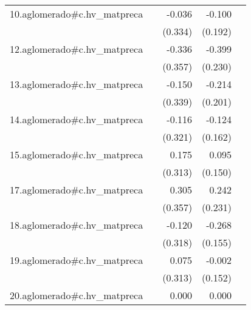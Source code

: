 {\begin{longtable}{l*{4}{D{.}{.}{-1}}}
\addlinespace
10.aglomerado#c.hv\_matpreca&                     &      -0.036         &      -0.100         &                     \\
            &                     &     (0.334)         &     (0.192)         &                     \\
\addlinespace
12.aglomerado#c.hv\_matpreca&                     &      -0.336         &      -0.399         &                     \\
            &                     &     (0.357)         &     (0.230)         &                     \\
\addlinespace
13.aglomerado#c.hv\_matpreca&                     &      -0.150         &      -0.214         &                     \\
            &                     &     (0.339)         &     (0.201)         &                     \\
\addlinespace
14.aglomerado#c.hv\_matpreca&                     &      -0.116         &      -0.124         &                     \\
            &                     &     (0.321)         &     (0.162)         &                     \\
\addlinespace
15.aglomerado#c.hv\_matpreca&                     &       0.175         &       0.095         &                     \\
            &                     &     (0.313)         &     (0.150)         &                     \\
\addlinespace
17.aglomerado#c.hv\_matpreca&                     &       0.305         &       0.242         &                     \\
            &                     &     (0.357)         &     (0.231)         &                     \\
\addlinespace
18.aglomerado#c.hv\_matpreca&                     &      -0.120         &      -0.268         &                     \\
            &                     &     (0.318)         &     (0.155)         &                     \\
\addlinespace
19.aglomerado#c.hv\_matpreca&                     &       0.075         &      -0.002         &                     \\
            &                     &     (0.313)         &     (0.152)         &                     \\
\addlinespace
20.aglomerado#c.hv\_matpreca&                     &       0.000         &       0.000         &                     \\

\end{longtable}}
